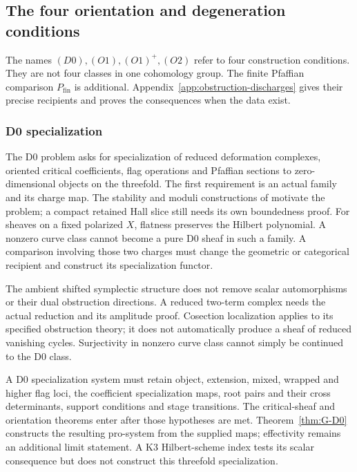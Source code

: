 \subsection{The four orientation and degeneration conditions}
\label{subsec:four-named-obstructions}

The names \((D0),(O1),(O1)^+,(O2)\) refer to four construction
conditions. They are not four classes in one cohomology group.
The finite Pfaffian comparison \(P_{\mathrm{fin}}\) is additional.
Appendix~\ref{app:obstruction-discharges} gives their precise
recipients and proves the consequences when the data exist.

\subsubsection{D0 specialization}
\label{subsubsec:obstruction-D0}

The D0 problem asks for specialization of reduced deformation
complexes, oriented critical coefficients, flag operations and
Pfaffian sections to zero-dimensional objects on the threefold.
The first requirement is an actual family and its charge map. The stability and moduli constructions of \cite{LiuProductStability,PiyaratneTodaModuli3folds} motivate the problem; a compact retained Hall slice still needs its own boundedness proof.
For sheaves on a fixed polarized \(X\), flatness preserves the
Hilbert polynomial. A nonzero curve class cannot become a pure
D0 sheaf in such a family. A comparison involving those two
charges must change the geometric or categorical recipient and
construct its specialization functor.

The ambient shifted symplectic structure \cite{PTVV2013} does
not remove scalar automorphisms or their dual obstruction
directions. A reduced two-term complex needs the actual reduction
and its amplitude proof. Cosection localization
\cite{KiemLi2013} applies to its specified obstruction theory;
it does not automatically produce a sheaf of reduced vanishing
cycles. Surjectivity in nonzero curve class cannot simply be
continued to the D0 class.

A D0 specialization system must retain object, extension, mixed,
wrapped and higher flag loci, the coefficient specialization maps,
root pairs and their cross determinants, support conditions and
stage transitions. The critical-sheaf and orientation theorems
\cite{BBDJS2015,JoyceUpmeier} enter after those hypotheses are
met. Theorem~\ref{thm:G-D0} constructs the resulting pro-system
from the supplied maps; effectivity remains an additional limit
statement. A K3 Hilbert-scheme index tests its scalar consequence
but does not construct this threefold specialization.

